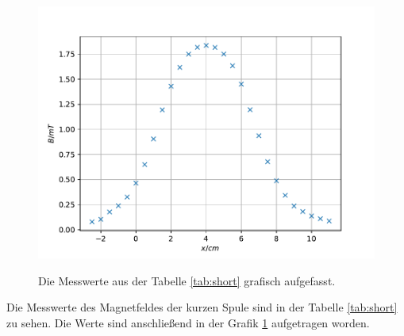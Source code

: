 \begin{figure}
  \centering
  \caption{Die Messwerte aus der Tabelle \ref{tab:short} grafisch aufgefasst.}
  \includegraphics[width=\textwidth]{content/data/plot_short.pdf}
  \label{fig:short}
\end{figure}

Die Messwerte des Magnetfeldes der kurzen Spule sind in der Tabelle \ref{tab:short} zu sehen.
Die Werte sind anschließend in der Grafik \ref{fig:short} aufgetragen worden.

